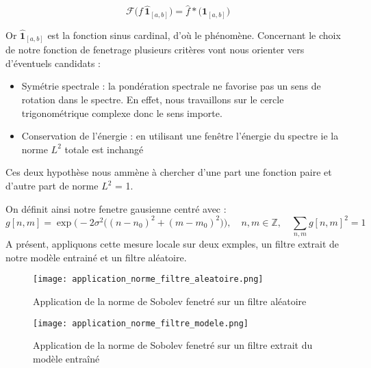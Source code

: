 \documentclass[12pt,a4paper]{article}
\begin{document}
\[
\mathcal{F}\Big(f \, \mathbf{\hat{1}}_{[a, b]}\Big) = \hat{f} * \Big(\mathbf{\hat{1}}_{[a,b]}\Big)
\]

Or $\mathbf{\hat{1}}_{[a,b]}$ est la fonction sinus cardinal, d'où le phénomène. Concernant le choix de notre fonction de fenetrage
plusieurs critères vont nous orienter vers d'éventuels candidats : 
\begin{itemize}
    \item Symétrie spectrale : la pondération spectrale ne favorise pas un sens de rotation dans le spectre. En effet, nous travaillons sur le cercle trigonométrique complexe donc le sens importe. 
    \item Conservation de l'énergie : en utilisant une fenêtre l'énergie du spectre ie la norme $L^2$ totale est inchangé
\end{itemize}
Ces deux hypothèse nous ammène à chercher d'une part une fonction paire et d'autre part de norme $L^2$ = 1. 
\begin{center}
\end{center}
On définit ainsi notre fenetre gausienne centré avec : 
\[
g[n,m] = \exp\Big(-2\sigma^2 \big((n-n_0)^2 + (m-m_0)^2\big)\Big), \quad n,m \in \mathbb{Z}, \quad
\sum_{n,m} g[n,m]^2 = 1
\]
A présent, appliquons cette mesure locale sur deux exmples, un filtre extrait de notre modèle entrainé et un filtre aléatoire. 
\begin{figure}[H] %
    \centering    %
    \texttt{[image: application\_norme\_filtre\_aleatoire.png]} %
    \caption{Application de la norme de Sobolev fenetré sur un filtre aléatoire} %
    \label{fig:mon_image} %
\end{figure}
\begin{figure}[H] %
    \centering    %
    \texttt{[image: application\_norme\_filtre\_modele.png]} %
    \caption{Application de la norme de Sobolev fenetré sur un filtre extrait du modèle entraîné} %
    \label{fig:mon_image} %
\end{figure}
\end{document}

